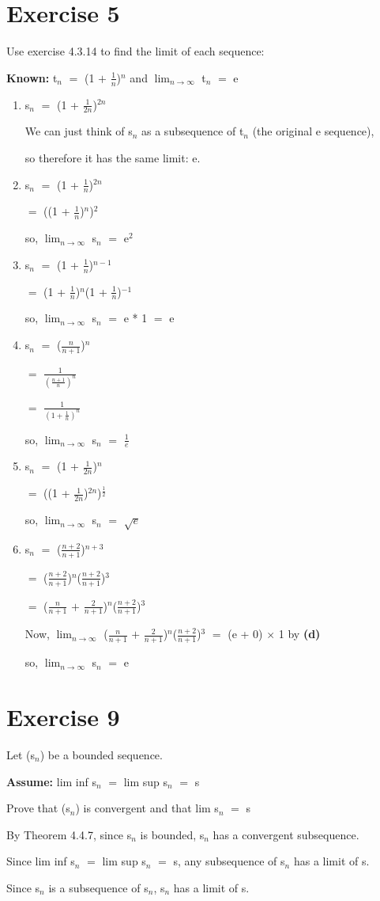 \documentclass{article}
\newcommand{\mt}[1]{\ensuremath{#1}}
\newcommand\bsc[2][\DefaultOpt]{%
  \def\DefaultOpt{#2}%
  \section[#1]{#2}%
}
\newcommand{\balist}{\begin{enumerate}[label=\alph*.]}
\newcommand{\elist}{\end{enumerate}}
\newcommand{\as}[1]{\textbf{Assume: } #1}
\newcommand{\bpth}[1]{\textbf{(#1)}}
\newcommand{\prn}[1]{(#1)}
\newcommand{\ps}{\mt{+} }
\newcommand{\eql}{\mt{=} }
\newcommand{\uw}[2]{#1\mt{_{#2}}}
\newcommand{\frc}[2]{\mt{\frac{#1}{#2}}}
\newcommand{\lmti}[1]{\mt{\displaystyle{\lim_{#1 \to \infty}}}}
\begin{document}
\bsc{Exercise 5}{

Use exercise 4.3.14 to find the limit of each sequence:

\textbf{Known:} \uw{t}{n} \eql \prn{1 \ps \frc{1}{n}}$^n$  and \lmti{n} \uw{t}{n} \eql e

\balist
\item \uw{s}{n} \eql (1 + \frc{1}{2n})$^{2n}$
	
	We can just think of \uw{s}{n} as a subsequence of \uw{t}{n} (the original e sequence),
	
	so therefore it has the same limit: e.
\item \uw{s}{n} \eql (1 + \frc{1}{n})$^{2n}$
	
	\eql ((1 + \frc{1}{n})$^n$)$^2$
	
	so, \lmti{n} \uw{s}{n} \eql e$^2$
\item \uw{s}{n} \eql (1 + \frc{1}{n})$^{n - 1}$

	\eql (1 + \frc{1}{n})$^{n}$(1 + \frc{1}{n})$^{-1}$
	
	so, \lmti{n} \uw{s}{n} \eql e * 1 \eql e
\item \uw{s}{n} \eql (\frc{n	}{n + 1})$^{n}$
	
	\eql \frc{1}{(\frc{n + 1}{n})^n}
	
	\eql \frc{1}{(1 + \frc{1}{n})^n}
	
	so, \lmti{n} \uw{s}{n} \eql \frc{1}{e}
\item \uw{s}{n} \eql (1 + \frc{1	}{2n})$^{n}$
	
	\eql ((1 + \frc{1}{2n})$^{2n}$)$^\frac{1}{2}$
	
	so, \lmti{n} \uw{s}{n} \eql $\sqrt{e}$
	
\item \uw{s}{n} \eql (\frc{n + 2	}{n + 1})$^{n + 3}$
	
	\eql (\frc{n + 2}{n + 1})$^{n}$(\frc{n + 2	}{n + 1})$^{3}$
	
	\eql (\frc{n}{n + 1} \ps \frc{2}{n + 1})$^{n}$(\frc{n + 2	}{n + 1})$^{3}$
	
	Now, \lmti{n} (\frc{n}{n + 1} \ps \frc{2}{n + 1})$^{n}$(\frc{n + 2	}{n + 1})$^{3}$ \eql (e + 0) $\times$ 1 by \bpth{d}
	
	so, \lmti{n} \uw{s}{n} \eql e
\elist

}

\bsc{Exercise 9}{

Let \prn{\uw{s}{n}} be a bounded sequence.

\as{lim inf \uw{s}{n} \eql lim sup \uw{s}{n} \eql s}

Prove that \prn{\uw{s}{n}} is convergent and that lim \uw{s}{n} \eql s

By Theorem 4.4.7, since \uw{s}{n} is bounded, \uw{s}{n} has a convergent subsequence.

Since lim inf \uw{s}{n} \eql lim sup \uw{s}{n} \eql s, any subsequence of \uw{s}{n} has a limit of s.

Since \uw{s}{n} is a subsequence of \uw{s}{n}, \uw{s}{n} has a limit of s.

}
\end{document}
